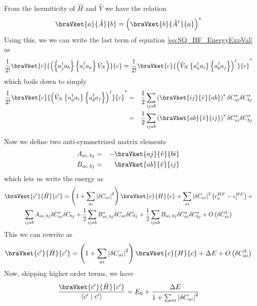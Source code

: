	From the hermiticity of $\hat{H}$ and $\hat{V}$ we have the relation
	\[
		\braVket{a}{\hat{A}}{b}=\left( \braVket{b}{\hat{A}^{\dagger}}{a} \right)^{*}
	\]
	Using this, we  we can write the last term of equation \ref{eq:SQ_HF_EnergyExpVal} as
	\[
		\frac{1}{2!}\braVket{c}{\left(\left\{ a_{j}^{\dagger}a_{b}\right\} \left\{ a_{i}^{\dagger}a_{a}\right\} \hat{V}_{N}\right)}{c} = \frac{1}{2!}\braVket{c}{\left(\hat{V}_{N}\left\{ a_{a}^{\dagger}a_{i}\right\} \left\{ a_{b}^{\dagger}a_{j}\right\} \right)^{\dagger}}{c}^{*}
	\]
	which boils down to simply
	\begin{eqnarray*}
		\frac{1}{2!}\braVket{c}{\left(\hat{V}_{N}\left\{ a_{a}^{\dagger}a_{i}\right\} \left\{ a_{b}^{\dagger}a_{j}\right\} \right)^{\dagger}}{c}^{*} & = & \frac{1}{2}\sum_{ijab}\left(\braVket{ij}{\hat{v}}{ab}\right)^{*}\delta C_{ai}^{*}\delta C_{bj}^{*}\\
		& = & \frac{1}{2}\sum_{ijab}\left(\braVket{ab}{\hat{v}}{ij}\right)^{*}\delta C_{ai}^{*}\delta C_{bj}^{*}
	\end{eqnarray*}

	Now we define two anti-symmetrized matrix elements
	\begin{eqnarray*}
		A_{ai,\,bj} & = & -\braVket{aj}{\hat{v}}{bi}\\
		B_{ai,\,bj} & = & \braVket{ab}{\hat{v}}{ij}
	\end{eqnarray*}
	which lets us write the energy as
	\begin{multline*}
		\braVket{c'}{\hat{H}}{c'} = \left(1 + \sum_{ai}\left|\delta C_{ai}\right|^{2}\right)\braVket{c}{H}{c}+
		\sum_{ai}\left|\delta C_{ai}\right|^{2}\left(\epsilon_{a}^{HF}-\epsilon_{i}^{HF}\right)+\\
		\sum_{ijab}A_{ai,\,bj}\delta C_{ai}^{*}\delta C_{bj}+\frac{1}{2}\sum_{ijab}B_{ai,\,bj}^{*}\delta C_{ai}\delta C_{bj} + \frac{1}{2}\sum_{ijab}B_{ai,\,bj}\delta C_{ai}^{*}\delta C_{bj}^{*} + O\left( \delta C_{ai}^{3} \right)
	\end{multline*}
	This we can rewrite as 
	\[
		\braVket{c'}{\hat{H}}{c'}=\left(1 + \sum_{ai}\left|\delta C_{ai}\right|^{2}\right)\braVket{c}{H}{c} + \Delta E + O\left( \delta C_{ai}^{3} \right)
	\]
	Now, skipping higher order terms, we have
	\[
		\frac{\braVket{c'}{\hat{H}}{c'}}{\left\langle c' \right. |  \left. c' \right\rangle}
		= E_{0} + \frac{\Delta E}{1+\sum_{ai}\left | \delta C_{ai} \right |^{2}}
	\]

